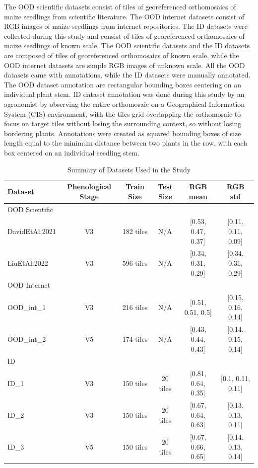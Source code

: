 \documentclass{article}
\begin{document}
The OOD scientific datasets consist of tiles of georeferenced orthomosaics of maize seedlings from scientific literature.
The OOD internet datasets consist of RGB images of maize seedlings from internet repositories.
The ID datasets were collected during this study and consist of tiles of georeferenced orthomosaics of maize seedlings of known scale.
The OOD scientific datasets and the ID datasets are composed of tiles of georeferenced orthomosaics 
of known scale, while the OOD internet datasets are simple RGB images of unknown scale.
All the OOD datasets came with annotations, while the ID datasets were manually annotated.
The OOD dataset annotation are rectangular bounding boxes centering on an individual plant stem.
ID dataset annotation was done during this study by an agronomist by observing the 
entire orthomosaic on a Geographical Information System (GIS) environment, 
with the tiles grid overlapping the orthomosaic to focus on target tiles without losing the surrounding
context, so without losing bordering plants. Annotations were created as squared 
bounding boxes of size length equal to the minimum distance between two plants in the row, 
with each box centered on an individual seedling stem. 

\begin{table}[h]
\caption{Summary of Datasets Used in the Study}
\label{tab:datasets}
\centering
\begin{tabular}{lccccc}
\hline
\textbf{Dataset} & \textbf{Phenological Stage} & \textbf{Train Size} & \textbf{Test Size} & \textbf{RGB mean} & \textbf{RGB std} \\
\hline
\multicolumn{6}{l}{OOD Scientific} \\
DavidEtAl.2021 \cite{davidPlantDetectionCounting2021} & V3 & 182 tiles & N/A & [0.53, 0.47, 0.37] & [0.11, 0.11, 0.09] \\
LiuEtAl.2022 \cite{liuEstimatingMaizeSeedling2022} & V3 & 596 tiles & N/A & [0.34, 0.31, 0.29] & [0.34, 0.31, 0.29] \\
\hline
\multicolumn{6}{l}{OOD Internet} \\
OOD\_int\_1 \cite{Maize_seedingDatasetOverview} & V3 & 216 tiles & N/A & [0.51, 0.51, 0.5] & [0.15, 0.16, 0.14] \\
OOD\_int\_2 \cite{MaizeseedlingdetectionDatasetOverview} & V5 & 174 tiles & N/A & [0.43, 0.44, 0.43] & [0.14, 0.15, 0.14] \\
\hline
\multicolumn{6}{l}{ID} \\
ID\_1 & V3 & 150 tiles & 20 tiles & [0.81, 0.64, 0.35] & [0.1, 0.11, 0.11] \\
ID\_2 & V3 & 150 tiles & 20 tiles & [0.67, 0.64, 0.63] & [0.13, 0.13, 0.11] \\
ID\_3 & V5 & 150 tiles & 20 tiles & [0.67, 0.66, 0.65] & [0.14, 0.13, 0.14] \\
\hline
\end{tabular}
\end{table}
\end{document}
